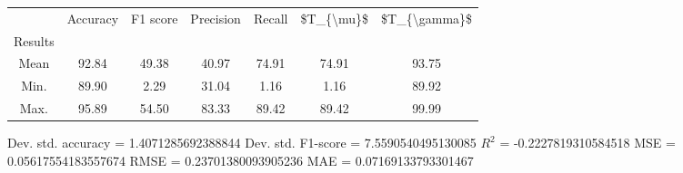 \begin{tabular}{|c|c|c|c|c|c|c|}
\toprule
{} &  Accuracy &  F1 score &  Precision &  Recall &  \$T\_\{\textbackslash mu\}\$ &  \$T\_\{\textbackslash gamma\}\$ \\
Results &           &           &            &         &            &               \\
\hline
Mean    &     92.84 &     49.38 &      40.97 &   74.91 &      74.91 &         93.75 \\
Min.    &     89.90 &      2.29 &      31.04 &    1.16 &       1.16 &         89.92 \\
Max.    &     95.89 &     54.50 &      83.33 &   89.42 &      89.42 &         99.99 \\
\bottomrule
\end{tabular}

 Dev. std. accuracy = 1.4071285692388844
 Dev. std. F1-score = 7.5590540495130085
 $R^2$ = -0.2227819310584518
 MSE = 0.05617554183557674
 RMSE = 0.23701380093905236
 MAE = 0.07169133793301467